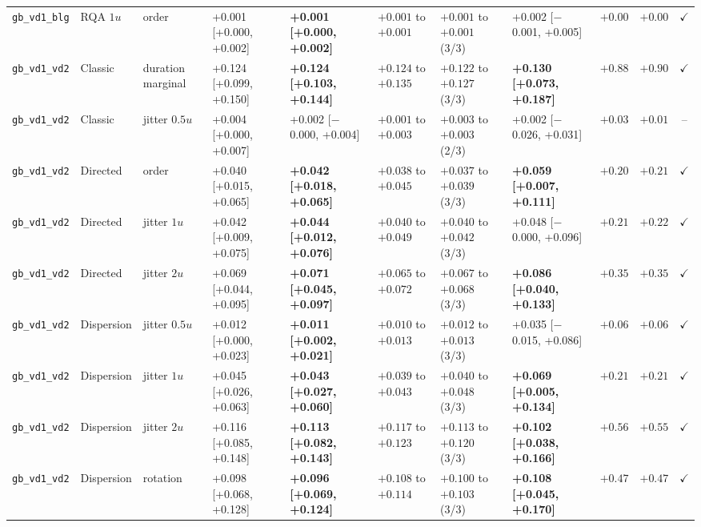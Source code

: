 \begin{longtable}{lllllllllrc}
\texttt{gb\_vd1\_blg} & RQA $1u$ & order & +0.001 [+0.000, +0.002] & \textbf{+0.001 [+0.000, +0.002]} & $+0.001$ to $+0.001$ & $+0.001$ to $+0.001$ (3/3) & +0.002 [$-$0.001, +0.005] & $+0.00$ & $+0.00$ & $\checkmark$ \\
\texttt{gb\_vd1\_vd2} & Classic & duration marginal & +0.124 [+0.099, +0.150] & \textbf{+0.124 [+0.103, +0.144]} & $+0.124$ to $+0.135$ & $+0.122$ to $+0.127$ (3/3) & \textbf{+0.130 [+0.073, +0.187]} & $+0.88$ & $+0.90$ & $\checkmark$ \\
\texttt{gb\_vd1\_vd2} & Classic & jitter $0.5u$ & +0.004 [+0.000, +0.007] & +0.002 [$-$0.000, +0.004] & $+0.001$ to $+0.003$ & $+0.003$ to $+0.003$ (2/3) & +0.002 [$-$0.026, +0.031] & $+0.03$ & $+0.01$ & -- \\
\texttt{gb\_vd1\_vd2} & Directed & order & +0.040 [+0.015, +0.065] & \textbf{+0.042 [+0.018, +0.065]} & $+0.038$ to $+0.045$ & $+0.037$ to $+0.039$ (3/3) & \textbf{+0.059 [+0.007, +0.111]} & $+0.20$ & $+0.21$ & $\checkmark$ \\
\texttt{gb\_vd1\_vd2} & Directed & jitter $1u$ & +0.042 [+0.009, +0.075] & \textbf{+0.044 [+0.012, +0.076]} & $+0.040$ to $+0.049$ & $+0.040$ to $+0.042$ (3/3) & +0.048 [$-$0.000, +0.096] & $+0.21$ & $+0.22$ & $\checkmark$ \\
\texttt{gb\_vd1\_vd2} & Directed & jitter $2u$ & +0.069 [+0.044, +0.095] & \textbf{+0.071 [+0.045, +0.097]} & $+0.065$ to $+0.072$ & $+0.067$ to $+0.068$ (3/3) & \textbf{+0.086 [+0.040, +0.133]} & $+0.35$ & $+0.35$ & $\checkmark$ \\
\texttt{gb\_vd1\_vd2} & Dispersion & jitter $0.5u$ & +0.012 [+0.000, +0.023] & \textbf{+0.011 [+0.002, +0.021]} & $+0.010$ to $+0.013$ & $+0.012$ to $+0.013$ (3/3) & +0.035 [$-$0.015, +0.086] & $+0.06$ & $+0.06$ & $\checkmark$ \\
\texttt{gb\_vd1\_vd2} & Dispersion & jitter $1u$ & +0.045 [+0.026, +0.063] & \textbf{+0.043 [+0.027, +0.060]} & $+0.039$ to $+0.043$ & $+0.040$ to $+0.048$ (3/3) & \textbf{+0.069 [+0.005, +0.134]} & $+0.21$ & $+0.21$ & $\checkmark$ \\
\texttt{gb\_vd1\_vd2} & Dispersion & jitter $2u$ & +0.116 [+0.085, +0.148] & \textbf{+0.113 [+0.082, +0.143]} & $+0.117$ to $+0.123$ & $+0.113$ to $+0.120$ (3/3) & \textbf{+0.102 [+0.038, +0.166]} & $+0.56$ & $+0.55$ & $\checkmark$ \\
\texttt{gb\_vd1\_vd2} & Dispersion & rotation & +0.098 [+0.068, +0.128] & \textbf{+0.096 [+0.069, +0.124]} & $+0.108$ to $+0.114$ & $+0.100$ to $+0.103$ (3/3) & \textbf{+0.108 [+0.045, +0.170]} & $+0.47$ & $+0.47$ & $\checkmark$ \\

\end{longtable}
